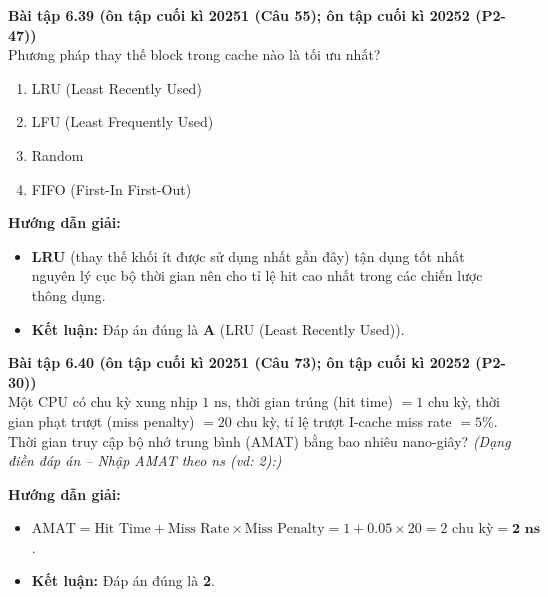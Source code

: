 \textbf{Bài tập 6.39 (ôn tập cuối kì 20251 (Câu 55); ôn tập cuối kì 20252 (P2-47))}\\
Phương pháp thay thế block trong cache nào là tối ưu nhất?
\begin{enumerate}[label=\Alph*.]
    \item LRU (Least Recently Used)
    \item LFU (Least Frequently Used)
    \item Random
    \item FIFO (First-In First-Out)
\end{enumerate}
\textbf{Hướng dẫn giải:}
\begin{itemize}
    \item \textbf{LRU} (thay thế khối ít được sử dụng nhất gần đây) tận dụng tốt nhất nguyên lý cục bộ thời gian nên cho tỉ lệ hit cao nhất trong các chiến lược thông dụng.
    \item \textbf{Kết luận:} Đáp án đúng là \textbf{A} (LRU (Least Recently Used)).
\end{itemize}

\textbf{Bài tập 6.40 (ôn tập cuối kì 20251 (Câu 73); ôn tập cuối kì 20252 (P2-30))}\\
Một CPU có chu kỳ xung nhịp $1\text{ ns}$, thời gian trúng (hit time) $= 1$ chu kỳ, thời gian phạt trượt (miss penalty) $= 20$ chu kỳ, tỉ lệ trượt I-cache miss rate $= 5\%$. Thời gian truy cập bộ nhớ trung bình (AMAT) bằng bao nhiêu nano-giây?
\textit{(Dạng điền đáp án -- Nhập AMAT theo ns (vd: 2):)}\par
\textbf{Hướng dẫn giải:}
\begin{itemize}
    \item $\text{AMAT} = \text{Hit Time} + \text{Miss Rate} \times \text{Miss Penalty} = 1 + 0.05 \times 20 = 2\text{ chu kỳ} = \mathbf{2\text{ ns}}$.
    \item \textbf{Kết luận:} Đáp án đúng là \textbf{2}.
\end{itemize}

